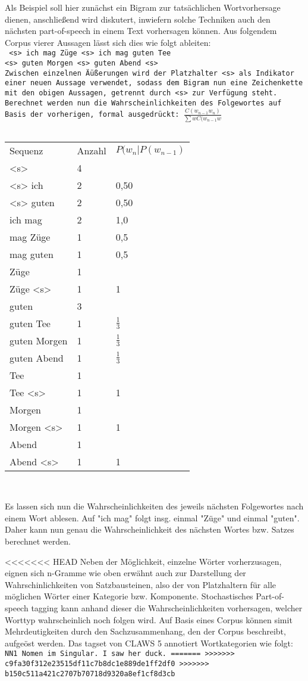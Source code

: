 \documentclass[12pt]{article}
\begin{document}
Als Beispiel soll hier zunächst ein Bigram zur tatsächlichen Wortvorhersage dienen, anschließend wird diskutert, inwiefern solche Techniken auch den nächsten part-of-speech in einem Text vorhersagen können. Aus folgendem Corpus vierer Aussagen lässt sich dies wie folgt ableiten:
\\ \tt
<s> ich mag Züge <s> ich mag guten Tee \\
<s> guten Morgen <s> guten Abend <s>
\\ \rm
Zwischen einzelnen Äüßerungen wird der Platzhalter <s> als Indikator einer neuen Aussage verwendet, sodass dem Bigram nun eine Zeichenkette mit den obigen Aussagen, getrennt durch \tt <s> \rm zur Verfügung steht.
Berechnet werden nun die Wahrscheinlichkeiten des Folgewortes auf Basis der vorherigen, formal ausgedrückt: $\frac{C(w_{n-1} w_{n})}{\sum{w}{}C(w_{n-1}w}$
\\ \tt
\begin{tabular}{lll}
Sequenz & Anzahl & $P(w_{n}|P(w_{n-1})$ \\
<s> & 4 & \\
<s> ich & 2 & 0,50 \\
<s> guten & 2 & 0,50 \\ 
ich mag & 2 & 1,0 \\ 
mag Züge & 1 & 0,5 \\
mag guten & 1 & 0,5 \\
Züge & 1 & \\
Züge <s> & 1 & 1 \\
guten & 3 & \\
guten Tee & 1 & $\frac{1}{3}$ \\
guten Morgen & 1 & $\frac{1}{3}$ \\
guten Abend & 1 & $\frac{1}{3}$ \\
Tee & 1 & \\
Tee <s> & 1 & 1 \\
Morgen & 1 & \\
Morgen <s> & 1 & 1 \\
Abend & 1 & \\
Abend <s> & 1 & 1\\
\end{tabular}
\\ \rm

Es lassen sich nun die Wahrscheinlichkeiten des jeweils nächsten Folgewortes nach einem Wort ablesen. Auf "ich mag" folgt insg. einmal "Züge" und einmal "guten". Daher kann nun genau die Wahrscheinlichkeit des nächsten Wortes bzw. Satzes berechnet werden.

<<<<<<< HEAD
Neben der Möglichkeit, einzelne Wörter vorherzusagen, eignen sich n-Gramme wie oben erwähnt auch zur Darstellung der Wahrschinlichkeiten von Satzbausteinen, also der von Platzhaltern für alle möglichen Wörter einer Kategorie bzw. Komponente. Stochastisches Part-of-speech tagging kann anhand dieser die Wahrscheinlichkeiten vorhersagen, welcher Worttyp wahrscheinlich noch folgen wird. Auf Basis eines Corpus können simit Mehrdeutigkeiten durch den Sachzusammenhang, den der Corpus beschreibt, aufgeöst werden. Das tagset von CLAWS 5 annotiert Wortkategorien wie folgt:
\tt
NN1 Nomen im Singular.
\rm
I saw her duck.
=======
>>>>>>> c9fa30f312e23515df11c7b8dc1e889de1ff2df0
>>>>>>> b150c511a421c2707b70718d9320a8ef1cf8d3cb

\newpage
\begin{thebibliography}{5}


\end{thebibliography}
\end{document}
